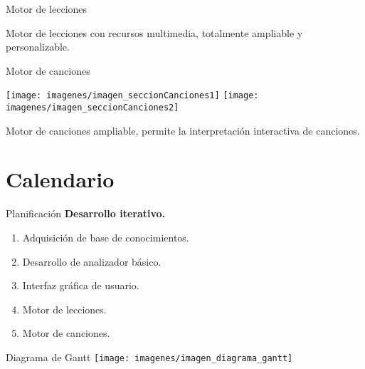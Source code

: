 \documentclass[11pt,xcolor=svgnames]{beamer}
\begin{document}
{\begin{frame}{Motor de lecciones}
\begin{center}
    \medskip

    Motor de lecciones con recursos multimedia, totalmente ampliable y personalizable.
  \end{center}

\end{frame}

\begin{frame}{Motor de canciones}

  \begin{center}
    \texttt{[image: imagenes/imagen\_seccionCanciones1]}\hspace{0.1cm}
    \texttt{[image: imagenes/imagen\_seccionCanciones2]}

    \medskip

    Motor de canciones ampliable, permite la interpretación interactiva de canciones.
  \end{center}

\end{frame}
}


\section{Calendario}

\begin{frame}{Planificación}
\textbf{Desarrollo iterativo.} \pause
\begin{enumerate}
\item Adquisición de base de conocimientos. \pause
\item Desarrollo de analizador básico. \pause
\item Interfaz gráfica de usuario. \pause
\item Motor de lecciones. \pause
\item Motor de canciones. \pause
\end{enumerate}
\end{frame}

{
\begin{frame}{Diagrama de Gantt}
\texttt{[image: imagenes/imagen\_diagrama\_gantt]}
\end{frame}
}
\end{document}
